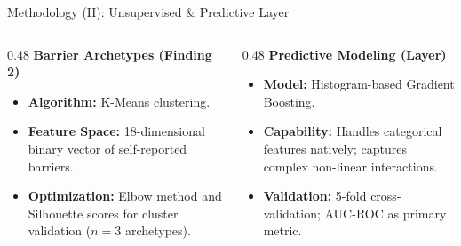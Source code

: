 \documentclass[10pt, aspectratio=169]{beamer}
\begin{document}
\begin{frame}{Methodology (II): Unsupervised \& Predictive Layer}
  \begin{columns}[T]
    \begin{column}{0.48\textwidth}
      \textbf{Barrier Archetypes (Finding 2)}
      \begin{itemize}
        \item \textbf{Algorithm:} K-Means clustering.
        \item \textbf{Feature Space:} 18-dimensional binary vector of self-reported barriers.
        \item \textbf{Optimization:} Elbow method and Silhouette scores for cluster validation ($n=3$ archetypes).
      \end{itemize}
    \end{column}
    \begin{column}{0.48\textwidth}
      \textbf{Predictive Modeling (Layer)}
      \begin{itemize}
        \item \textbf{Model:} Histogram-based Gradient Boosting.
        \item \textbf{Capability:} Handles categorical features natively; captures complex non-linear interactions.
        \item \textbf{Validation:} 5-fold cross-validation; AUC-ROC as primary metric.
      \end{itemize}
    \end{column}
  \end{columns}
\end{frame}
\end{document}
